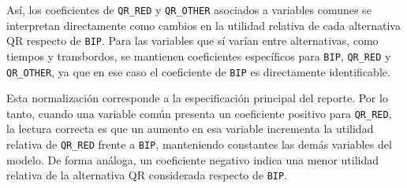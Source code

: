 Así, los coeficientes de \texttt{QR\_RED} y \texttt{QR\_OTHER} asociados a variables comunes se interpretan directamente como cambios en la utilidad relativa de cada alternativa QR respecto de \texttt{BIP}. Para las variables que sí varían entre alternativas, como tiempos y transbordos, se mantienen coeficientes específicos para \texttt{BIP}, \texttt{QR\_RED} y \texttt{QR\_OTHER}, ya que en ese caso el coeficiente de \texttt{BIP} es directamente identificable.

Esta normalización corresponde a la especificación principal del reporte. Por lo tanto, cuando una variable común presenta un coeficiente positivo para \texttt{QR\_RED}, la lectura correcta es que un aumento en esa variable incrementa la utilidad relativa de \texttt{QR\_RED} frente a \texttt{BIP}, manteniendo constantes las demás variables del modelo. De forma análoga, un coeficiente negativo indica una menor utilidad relativa de la alternativa QR considerada respecto de \texttt{BIP}.
